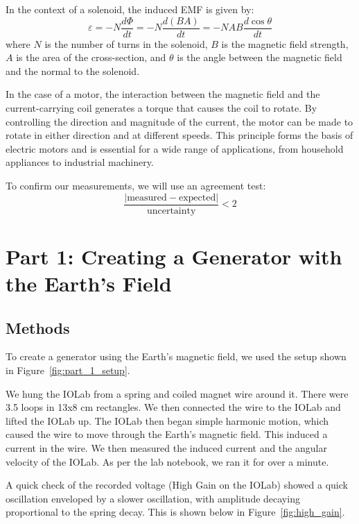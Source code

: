 \documentclass[11pt]{article}
\let\oldsection\section
\renewcommand\section{\clearpage\oldsection}
\begin{document}
    In the context of a solenoid, the induced EMF is given by:
    \begin{equation}
        \varepsilon = -N\frac{d\Phi}{dt} = -N\frac{d(BA)}{dt} = -NAB\frac{d\cos\theta}{dt}
        \label{eq:solenoid}
    \end{equation}
    where $N$ is the number of turns in the solenoid, $B$ is the magnetic field strength, $A$ is the area of the cross-section, and $\theta$ is the angle between the magnetic field and the normal to the solenoid.

    In the case of a motor, the interaction between the magnetic field and the current-carrying coil generates a torque that causes the coil to rotate.
    By controlling the direction and magnitude of the current, the motor can be made to rotate in either direction and at different speeds.
    This principle forms the basis of electric motors and is essential for a wide range of applications, from household appliances to industrial machinery.

    To confirm our measurements, we will use an agreement test:
    \begin{equation}
        \frac{|\text{measured} - \text{expected}|}{\text{uncertainty}} < 2
        \label{eq:agreement}
    \end{equation}


    \section{Part 1: Creating a Generator with the Earth’s Field}\label{sec:part_1}

    \subsection{Methods}\label{subsec:part_1_methods}
    To create a generator using the Earth's magnetic field, we used the setup shown in Figure~\ref{fig:part_1_setup}.

    We hung the IOLab from a spring and coiled magnet wire around it.
    There were 3.5 loops in 13x8 cm rectangles.
    We then connected the wire to the IOLab and lifted the IOLab up.
    The IOLab then began simple harmonic motion, which caused the wire to move through the Earth's magnetic field.
    This induced a current in the wire.
    We then measured the induced current and the angular velocity of the IOLab.
    As per the lab notebook, we ran it for over a minute.

    A quick check of the recorded voltage (High Gain on the IOLab) showed a quick oscillation enveloped by a slower oscillation, with amplitude decaying proportional to the spring decay.
    This is shown below in Figure~\ref{fig:high_gain}.
\end{document}
